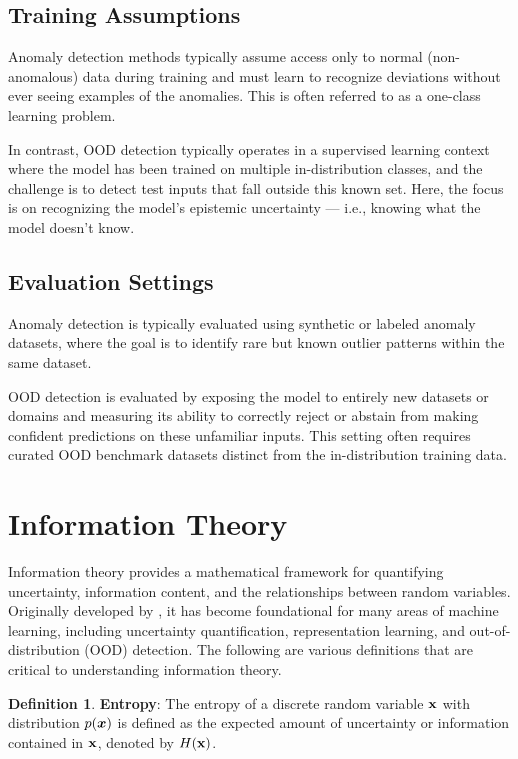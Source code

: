 \documentclass[11pt, oneside]{book}
\theoremstyle{plain}
\theoremstyle{definition}
\newtheorem{definition}[theorem]{Definition}
\theoremstyle{remark}
\begin{document}
\subsection{Training Assumptions}

Anomaly detection methods typically assume access only to normal (non-anomalous) data during training and must learn to recognize deviations without ever seeing examples of the anomalies. This is often referred to as a one-class learning problem.

In contrast, OOD detection typically operates in a supervised learning context where the model has been trained on multiple in-distribution classes, and the challenge is to detect test inputs that fall outside this known set. Here, the focus is on recognizing the model’s epistemic uncertainty — i.e., knowing what the model doesn’t know.

\subsection{Evaluation Settings}

Anomaly detection is typically evaluated using synthetic or labeled anomaly datasets, where the goal is to identify rare but known outlier patterns within the same dataset.

OOD detection is evaluated by exposing the model to entirely new datasets or domains and measuring its ability to correctly reject or abstain from making confident predictions on these unfamiliar inputs. This setting often requires curated OOD benchmark datasets distinct from the in-distribution training data.

\section{Information Theory}

Information theory provides a mathematical framework for quantifying uncertainty, information content, and the relationships between random variables. Originally developed by \citet{shannon1948mathematical}, it has become foundational for many areas of machine learning, including uncertainty quantification, representation learning, and out-of-distribution (OOD) detection. The following are various definitions that are critical to understanding information theory.


\begin{definition}
\textbf{Entropy}: The entropy of a discrete random variable ${\mathbf{x}}$ with distribution $p({\bm{x}})$ is defined as the expected amount of uncertainty or information contained in ${\mathbf{x}}$, denoted by $H({\mathbf{x}})$.
\label{def:entropy}
\end{definition}
\end{document}
